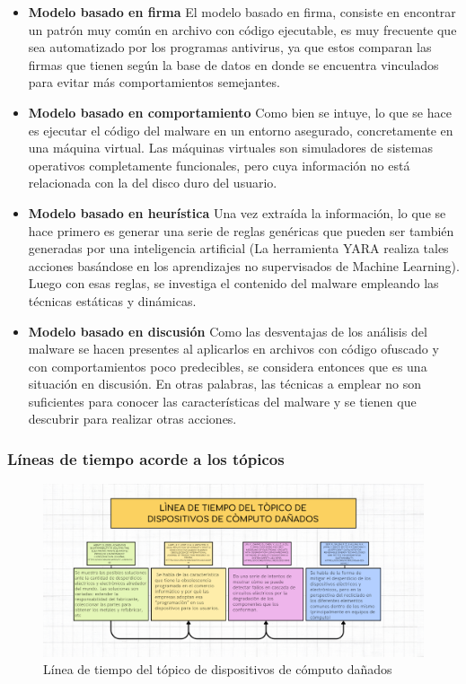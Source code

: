 \begin{itemize}
  \item \textbf{Modelo basado en firma}
    El modelo basado en firma, consiste en encontrar un patrón muy común en
    archivo con código ejecutable, es muy frecuente que sea automatizado por
    los programas antivirus, ya que estos comparan las firmas que tienen según
    la base de datos en donde se encuentra vinculados para evitar más
    comportamientos semejantes.

  \item \textbf{Modelo basado en comportamiento}
    Como bien se intuye, lo que se hace es ejecutar el código del malware en un
    entorno asegurado, concretamente en una máquina virtual. Las máquinas
    virtuales son simuladores de sistemas operativos completamente funcionales,
    pero cuya información no está relacionada con la del disco duro del usuario.

  \item \textbf{Modelo basado en heurística}
    Una vez extraída la información, lo que se hace primero es generar una
    serie de reglas genéricas que pueden ser también generadas por una
    inteligencia artificial (La herramienta YARA realiza tales acciones
    basándose en los aprendizajes no supervisados de Machine Learning). Luego
    con esas reglas, se investiga el contenido del malware empleando las
    técnicas estáticas y dinámicas.

  \item \textbf{Modelo basado en discusión}
    Como las desventajas de los análisis del malware se hacen presentes al
    aplicarlos en archivos con código ofuscado y con comportamientos poco
    predecibles, se considera entonces que es una situación en discusión. En
    otras palabras, las técnicas a emplear no son suficientes para conocer las
    características del malware y se tienen que descubrir para realizar otras
    acciones.
\end{itemize}

\subsubsection{Líneas de tiempo acorde a los tópicos}

\begin{figure}[hb!]
  \centering
  \includegraphics[width=1\textwidth]{./pictures/timeline_1.png}
  \caption{Línea de tiempo del tópico de dispositivos de cómputo dañados}
  \label{fig:timeline1}
\end{figure} 

